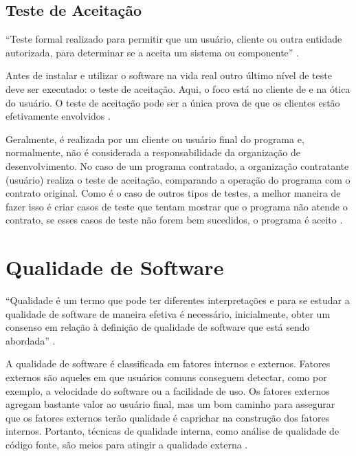 \subsection{Teste de Aceitação}

“Teste formal realizado para permitir que um usuário, cliente ou outra entidade autorizada, para determinar se a aceita um sistema ou componente” \cite{ieee}.

Antes de instalar e utilizar o software na vida real outro último nível de teste deve ser executado: o teste de aceitação. Aqui, o foco está no cliente de e na ótica do usuário. O teste de aceitação pode ser a única prova de que os clientes estão efetivamente envolvidos \cite[pág.~61]{spillner2014}.

Geralmente, é realizada por um cliente ou usuário final do programa e, normalmente, não é considerada a responsabilidade da organização de desenvolvimento. No caso de um programa contratado, a organização contratante (usuário) realiza o teste de aceitação, comparando a operação do programa com o contrato original. Como é o caso de outros tipos de testes, a melhor maneira de fazer isso é criar casos de teste que tentam mostrar que o programa não atende o contrato, se esses casos de teste não forem bem sucedidos, o programa é aceito \cite[pág.~104]{myers2004}.  

\section{Qualidade de Software}

\begin{citacao}
“Qualidade é um termo que pode ter diferentes interpretações e para se estudar a qualidade de software de maneira efetiva é necessário, inicialmente, obter um consenso em relação à definição de qualidade de software que está sendo abordada” \cite[pág.~11]{braga2012}.
\end{citacao}

A qualidade de software é classificada em fatores internos e externos. Fatores externos são aqueles em que usuários comuns conseguem detectar, como por exemplo, a velocidade do software ou a facilidade de uso. Os fatores externos agregam bastante valor ao usuário final, mas um bom caminho para assegurar que os fatores externos terão qualidade é caprichar na construção dos fatores internos. Portanto, técnicas de qualidade interna, como análise de qualidade de código fonte, são meios para atingir a qualidade externa \cite[pág.~4]{bueno2011}.

